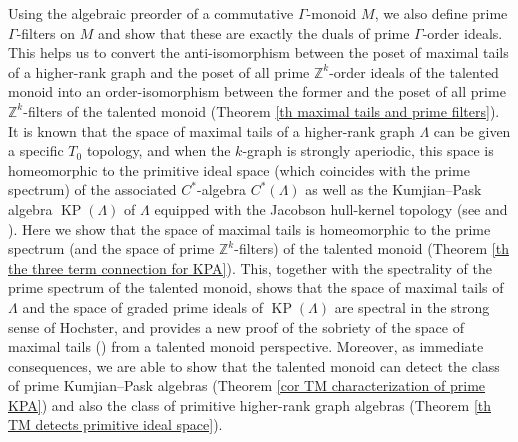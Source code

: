 \documentclass[a4paper,reqno,12pt]{amsart}
\numberwithin{equation}{section}
\theoremstyle{definition}
\theoremstyle{remark}
\newcommand{\KP}{\operatorname{KP}}
\begin{document}
Using the algebraic preorder of a commutative $\Gamma$-monoid $M$, we also define prime $\Gamma$-filters on $M$ and show that these are exactly the duals of prime $\Gamma$-order ideals. This helps us to convert the anti-isomorphism between the poset of maximal tails of a higher-rank graph and the poset of all prime $\mathbb{Z}^k$-order ideals of the talented monoid into an order-isomorphism between the former and the poset of all prime $\mathbb{Z}^k$-filters of the talented monoid (Theorem \ref{th maximal tails and prime filters}). It is known that the space of maximal tails of a higher-rank graph $\Lambda$ can be given a specific $T_0$ topology, and when the $k$-graph is strongly aperiodic, this space is homeomorphic to the primitive ideal space (which coincides with the prime spectrum) of the associated $C^*$-algebra $C^*(\Lambda)$ as well as the Kumjian--Pask algebra $\KP(\Lambda)$ of $\Lambda$ equipped with the Jacobson hull-kernel topology (see \cite{KangPask} and \cite{Larki}). Here we show that the space of maximal tails is homeomorphic to the prime spectrum (and the space of prime $\mathbb{Z}^k$-filters) of the talented monoid (Theorem \ref{th the three term connection for KPA}). This, together with the spectrality of the prime spectrum of the talented monoid, shows that the space of maximal tails of $\Lambda$ and the space of graded prime ideals of $\KP(\Lambda)$ are spectral in the strong sense of Hochster, and provides a new proof of the sobriety of the space of maximal tails (\cite[Proposition 4.4]{KangPask}) from a talented monoid perspective. Moreover, as immediate consequences, we are able to show that the talented monoid can detect the class of prime Kumjian--Pask algebras (Theorem \ref{cor TM characterization of prime KPA}) and also the class of primitive higher-rank graph algebras (Theorem \ref{th TM detects primitive ideal space}). 
\end{document}
